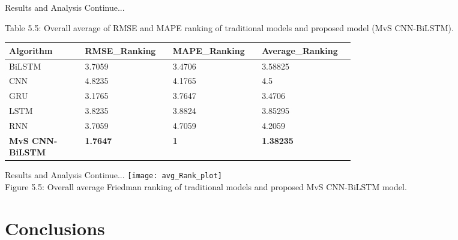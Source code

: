 \documentclass[12pt, aspectratio=169]{beamer}
\begin{document}
\begin{frame}{Results and Analysis \tiny{Continue...}}
\begin{table}
	\centering
	\scriptsize {Table 5.5: Overall average of RMSE and MAPE ranking of traditional models and proposed model (MvS CNN-BiLSTM).}
    \begin{tabular}[c]{ |p{0.19\linewidth} |p{0.16\linewidth}| p{0.16\linewidth} |p{0.16\linewidth}|  }
    \hline Algorithm&RMSE\_Ranking&MAPE\_Ranking&Average\_Ranking \\ \hline
    BiLSTM&3.7059&3.4706&3.58825\\
    CNN&4.8235&4.1765&4.5\\
    GRU&3.1765&3.7647&3.4706\\
    LSTM&3.8235&3.8824&3.85295\\
    RNN&3.7059&4.7059&4.2059\\
    \textbf{MvS CNN-BiLSTM}&\textbf{1.7647}&\textbf{1}&\textbf{1.38235} \\\hline
    \end{tabular}
    \end{table}
\end{frame}

\begin{frame}{Results and Analysis \tiny{Continue...}}
	\centering
	\texttt{[image: avg\_Rank\_plot]}\\
	\scriptsize{Figure 5.5: Overall average Friedman ranking of traditional models and proposed MvS CNN-BiLSTM model.}
\end{frame}
\section{Conclusions}
\end{document}
